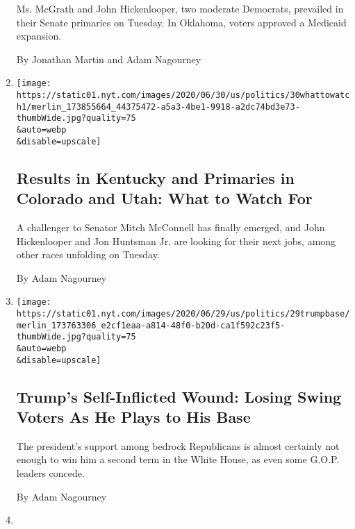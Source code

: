\begin{enumerate}
  Ms. McGrath and John Hickenlooper, two moderate Democrats, prevailed
  in their Senate primaries on Tuesday. In Oklahoma, voters approved a
  Medicaid expansion.

  By Jonathan Martin and Adam Nagourney
\item
  \href{/2020/06/30/us/politics/election-results-mcgrath-booker-colorado-hickenlooper-romanoff.html}{}

  \texttt{[image: https://static01.nyt.com/images/2020/06/30/us/politics/30whattowatch1/merlin\_173855664\_44375472-a5a3-4be1-9918-a2dc74bd3e73-thumbWide.jpg?quality=75\\\&auto=webp\\\&disable=upscale]}

  \hypertarget{results-in-kentucky-and-primaries-in-colorado-and-utah-what-to-watch-for}{%
  \subsection{Results in Kentucky and Primaries in Colorado and Utah:
  What to Watch
  For}\label{results-in-kentucky-and-primaries-in-colorado-and-utah-what-to-watch-for}}

  A challenger to Senator Mitch McConnell has finally emerged, and John
  Hickenlooper and Jon Huntsman Jr. are looking for their next jobs,
  among other races unfolding on Tuesday.

  By Adam Nagourney
\item
  \href{/2020/06/29/us/politics/trump-swing-voters.html}{}

  \texttt{[image: https://static01.nyt.com/images/2020/06/29/us/politics/29trumpbase/merlin\_173763306\_e2cf1eaa-a814-48f0-b20d-ca1f592c23f5-thumbWide.jpg?quality=75\\\&auto=webp\\\&disable=upscale]}

  \hypertarget{trumps-self-inflicted-wound-losing-swing-voters-as-he-plays-to-his-base}{%
  \subsection{Trump's Self-Inflicted Wound: Losing Swing Voters As He
  Plays to His
  Base}\label{trumps-self-inflicted-wound-losing-swing-voters-as-he-plays-to-his-base}}

  The president's support among bedrock Republicans is almost certainly
  not enough to win him a second term in the White House, as even some
  G.O.P. leaders concede.

  By Adam Nagourney
\item
  \href{/2020/06/21/us/politics/biden-gay-rights-lgbt.html}{}


\end{enumerate}

